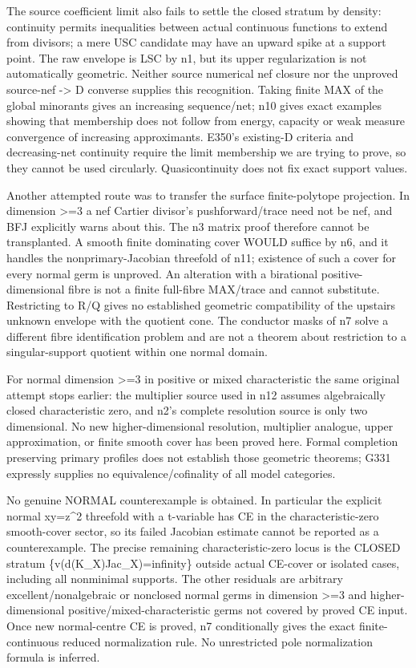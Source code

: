 \documentclass[11pt]{article}
\begin{document}
The source coefficient limit also fails to settle the closed stratum by density: continuity permits inequalities between actual continuous functions to extend from divisors; a mere USC candidate may have an upward spike at a support point. The raw envelope is LSC by n1, but its upper regularization is not automatically geometric. Neither source numerical nef closure nor the unproved source-nef -> D converse supplies this recognition. Taking finite MAX of the global minorants gives an increasing sequence/net; n10 gives exact examples showing that membership does not follow from energy, capacity or weak measure convergence of increasing approximants. E350's existing-D criteria and decreasing-net continuity require the limit membership we are trying to prove, so they cannot be used circularly. Quasicontinuity does not fix exact support values.

Another attempted route was to transfer the surface finite-polytope projection. In dimension >=3 a nef Cartier divisor's pushforward/trace need not be nef, and BFJ explicitly warns about this. The n3 matrix proof therefore cannot be transplanted. A smooth finite dominating cover WOULD suffice by n6, and it handles the nonprimary-Jacobian threefold of n11; existence of such a cover for every normal germ is unproved. An alteration with a birational positive-dimensional fibre is not a finite full-fibre MAX/trace and cannot substitute. Restricting to R/Q gives no established geometric compatibility of the upstairs unknown envelope with the quotient cone. The conductor masks of n7 solve a different fibre identification problem and are not a theorem about restriction to a singular-support quotient within one normal domain.

For normal dimension >=3 in positive or mixed characteristic the same original attempt stops earlier: the multiplier source used in n12 assumes algebraically closed characteristic zero, and n2's complete resolution source is only two dimensional. No new higher-dimensional resolution, multiplier analogue, upper approximation, or finite smooth cover has been proved here. Formal completion preserving primary profiles does not establish those geometric theorems; G331 expressly supplies no equivalence/cofinality of all model categories.

No genuine NORMAL counterexample is obtained. In particular the explicit normal xy=z\textasciicircum{}2 threefold with a t-variable has CE in the characteristic-zero smooth-cover sector, so its failed Jacobian estimate cannot be reported as a counterexample. The precise remaining characteristic-zero locus is the CLOSED stratum \{v(d(K\_X)Jac\_X)=infinity\} outside actual CE-cover or isolated cases, including all nonminimal supports. The other residuals are arbitrary excellent/nonalgebraic or nonclosed normal germs in dimension >=3 and higher-dimensional positive/mixed-characteristic germs not covered by proved CE input. Once new normal-centre CE is proved, n7 conditionally gives the exact finite-continuous reduced normalization rule. No unrestricted pole normalization formula is inferred.
\end{document}
